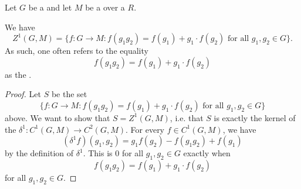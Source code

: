 \begin{lemma} \label{lemma:cocycle_condition_for_the_first_cocycle_group_of_a_group_acting_on_an_abelian_group}
    Let $G$ be a  and let $M$ be a  over a  $R$.

    We have 
    $$Z^1(G,M) = \{f: G \to M: f(g_1g_2) = f(g_1) + g_1 \cdot f(g_2) \text{ for all } g_1,g_2 \in G\}.$$
    As such, one often refers to the equality 
    $$f(g_1g_2) = f(g_1) + g_1 \cdot f(g_2)$$
    as the .
\end{lemma}
\begin{proof}
    Let $S$ be the set 
    $$\{f: G \to M: f(g_1g_2) = f(g_1) + g_1 \cdot f(g_2) \text{ for all } g_1,g_2 \in G\}$$
    above. We want to show that $S = Z^1(G,M)$, i.e. that $S$ is exactly the kernel of the  $\delta^1: C^1(G,M) \to C^2(G,M)$. For every $f \in C^1(G,M)$, we have  
    $$(\delta^1 f)(g_1,g_2) = g_1 f(g_2) - f(g_1g_2) + f(g_1) $$
    by the definition of $\delta^1$. This is $0$ for all $g_1,g_2 \in G$ exactly when
    $$f(g_1g_2) = f(g_1) + g_1 \cdot f(g_2)$$
    for all $g_1,g_2 \in G$. 
\end{proof}